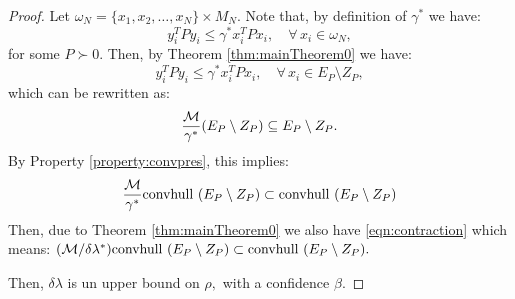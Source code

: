 \begin{proof}Let $\omega_N = \{x_1, x_2, \ldots, x_N\} \times M_N$. Note that, by definition of $\gamma^*$ we have:
\begin{equation*} y_i^TPy_i \leq \gamma^* x_i^TPx_i, \quad \forall\, x_i \in \omega_N, \end{equation*}
for some $P \succ 0$. Then, by Theorem \ref{thm:mainTheorem0} we have:
\begin{equation*} y_i^TPy_i \leq \gamma^*x_i^TPx_i, \quad \forall\, x_i \in E_P \setminus Z_P,\end{equation*}
which can be rewritten as:
\begin{equation*}\frac{\mathcal{M}}{\gamma^*}(E_P \setminus Z_P) \subseteq E_P \setminus Z_P.
\end{equation*}
By Property \ref{property:convpres}, this implies:
$$\frac{\mathcal{M}}{\gamma^*} \mbox{convhull }(E_P \setminus Z_P) \subset \mbox{convhull }(E_P \setminus Z_P)$$
Then, due to Theorem \ref{thm:mainTheorem0} we also have \eqref{eqn:contraction} which means:
$(\mathcal{M}/\delta \lambda^*) \mbox{convhull } (E_P \setminus Z_P) \subset \mbox{convhull } (E_P\setminus Z_P).$

Then, $\delta\lambda$ is un upper bound on $\rho,$ with a confidence $\beta.$ 
\end{proof}
